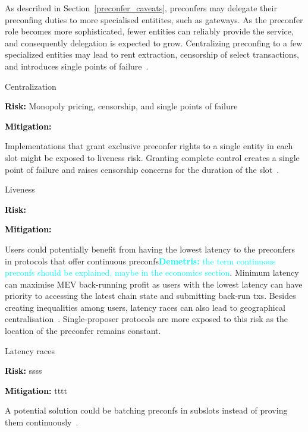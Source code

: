 \documentclass[a4paper]{article}
\theoremstyle{boldstyle}
\newlength{\entrysep}
\newcommand{\risk}[1]{\par\noindent\textbf{\textcolor{black}{Risk:}} #1\par\vspace{\entrysep}}
\newcommand{\mitigation}[1]{\par\noindent\textbf{\textcolor{black}{Mitigation:}} #1}
\newcommand{\dk}[1]{\textcolor{cyan}{\textbf{Demetris:} #1}}
\begin{document}
        As described in Section~\ref{preconfer_caveats}, preconfers may delegate their preconfing duties to more specialised entitites, such as gateways. As the preconfer role becomes more sophisticated, fewer entities can reliably provide the service, and consequently delegation is expected to grow. Centralizing preconfing to a few specialized entities may lead to rent extraction, censorship of select transactions, and introduces single points of failure~\cite{W:DelegationinBolt:OutsourcingSophisticationWhilePreservingDecentralization,W:BecomingBased:APathtowardsDecentralisedSequencing}.
        \begin{riskbox}{Centralization}
            \risk{Monopoly pricing, censorship, and single points of failure}
            \mitigation{}
        \end{riskbox}

        Implementations that grant exclusive preconfer rights to a single entity in each slot might be exposed to liveness risk. Granting complete control creates a single point of failure and raises censorship concerns for the duration of the slot~\cite{W:StrawmanningBasedPreconfirmations,W:BasedPreconfirmationswithMulti-roundMEV-Boost}. 
        \begin{riskbox}{Liveness}
            \risk{}
            \mitigation{}
        \end{riskbox}
        
        Users could potentially benefit from having the lowest latency to the preconfers in protocols that offer continuous preconfs\dk{the term continuous preconfs should be explained, maybe in the economics section}. Minimum latency can maximise MEV back-running profit as users with the lowest latency can have priority to accessing the latest chain state and submitting back-run txs. Besides creating inequalities among users, latency races can also lead to geographical centralisation~\cite{W:StrawmanningBasedPreconfirmations}. 
        Single-proposer protocols are more exposed to this risk as the location of the preconfer remains constant. 
        \begin{riskbox}{Latency races}
            \risk{ssss}
            \mitigation{tttt}
        \end{riskbox}
        A potential solution could be batching preconfs in subslots instead of proving them continuously~\cite{W:BasedPreconfirmationswithMulti-roundMEV-Boost}.
\end{document}
